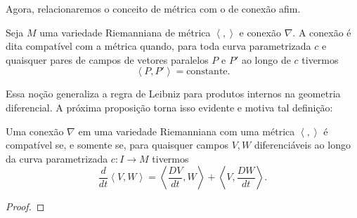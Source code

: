 Agora, relacionaremos o conceito de métrica com o de conexão afim.
\begin{definition}
	\label{def:conexao-compativel}
	Seja $M$ uma variedade Riemanniana de métrica $\left<,\right>$ e conexão $\nabla$.
	A conexão é dita compatível com a métrica quando, para toda curva parametrizada $c$ e quaisquer pares de campos de vetores paralelos $P$ e $P'$ ao longo de $c$ tivermos
	\begin{equation*}
		\left<P,P'\right> = \text{constante}.
	\end{equation*}
\end{definition}
Essa noção generaliza a regra de Leibniz para produtos internos na geometria diferencial. A próxima proposição torna isso evidente e motiva tal definição:
\begin{proposition}
	\label{prop:leibniz-compativel}
	Uma conexão $\nabla$ em uma variedade Riemanniana com uma métrica $\left<,\right>$ é compatível se, e somente se, para quaisquer campos $V,W$ diferenciáveis ao longo da curva parametrizada $c:I\to M$ tivermos
	\begin{equation}
		\label{eq:leibnz-para-covariante}
		\frac{d}{dt}\left<V,W\right> =\left<\frac{DV}{dt},W\right> +\left<V,\frac{DW}{dt}\right>.
	\end{equation}
	\begin{proof}


\end{proof}
\end{proposition}
